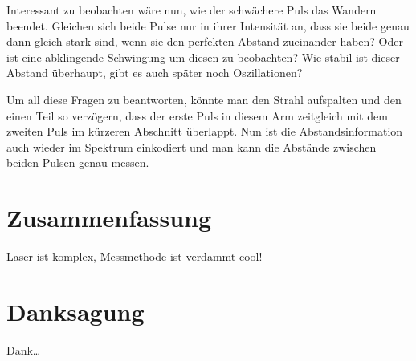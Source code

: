 \documentclass[bachelor,       %
               twoside,        %
               BCOR10mm,       %
               english,ngerman, %
               ]{GAUBM}
\begin{document}
Interessant zu beobachten wäre nun, wie der schwächere Puls das Wandern beendet.
Gleichen sich beide Pulse nur in ihrer Intensität an, dass sie beide genau dann gleich stark sind, wenn sie den perfekten Abstand zueinander haben?
Oder ist eine abklingende Schwingung um diesen zu beobachten?
Wie stabil ist dieser Abstand überhaupt, gibt es auch später noch Oszillationen?

Um all diese Fragen zu beantworten, könnte man den Strahl aufspalten und den einen Teil so verzögern, dass der erste Puls in diesem Arm zeitgleich mit dem zweiten Puls im kürzeren Abschnitt überlappt.
Nun ist die Abstandsinformation auch wieder im Spektrum einkodiert und man kann die Abstände zwischen beiden Pulsen genau messen.


\chapter{Zusammenfassung}
Laser ist komplex, Messmethode ist verdammt cool!


\cleardoublepage
 

\chapter*{Danksagung}
Dank\dots

\Declaration
\end{document}
